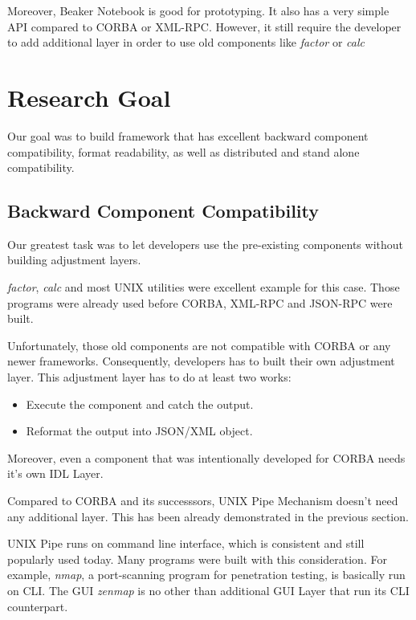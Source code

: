 \documentclass[conference]{IEEEtran}
\begin{document}
Moreover, Beaker Notebook is good for prototyping. It also has a very simple API compared to
CORBA or XML-RPC. However, it still require the developer to add additional layer
in order to use old components like {\it factor} or {\it calc}


\section{Research Goal}

Our goal was to build framework that has excellent backward component compatibility, 
format readability, as well as distributed and stand alone compatibility. 


\subsection{Backward Component Compatibility}

Our greatest task was to let developers use the pre-existing components without building 
adjustment layers.

{\it factor}, {\it calc} and most UNIX utilities were excellent example for this case.
Those programs were already used before CORBA, XML-RPC and JSON-RPC were built.

Unfortunately, those old components are not compatible with CORBA or any newer frameworks.
Consequently, developers has to built their own adjustment layer. This adjustment layer has 
to do at least two works:

\begin{itemize}
    \item Execute the component and catch the output. 
    \item Reformat the output into JSON/XML object.
\end{itemize}

Moreover, even a component that was intentionally developed for CORBA needs it's own IDL Layer.

Compared to CORBA and its successsors, UNIX Pipe Mechanism doesn't need any additional layer.
This has been already demonstrated in the previous section.

UNIX Pipe runs on command line interface, which is consistent and still popularly used today.
Many programs were built with this consideration. For example, {\it nmap}, a port-scanning 
program for penetration testing, is basically run on CLI. The GUI  {\it zenmap} is no other than
additional GUI Layer that run its CLI counterpart.
\end{document}

